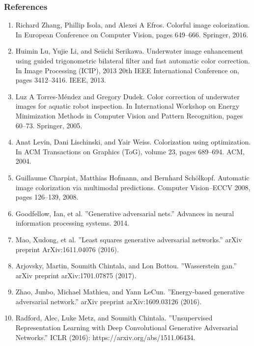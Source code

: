 \documentclass{beamer}
\begin{document}


\begin{frame}
\frametitle{\textbf{References}}
\tiny
\begin{enumerate}
\item Richard Zhang, Phillip Isola, and Alexei A Efros. Colorful image colorization. In European Conference on Computer Vision,
pages 649–666. Springer, 2016.
\item Huimin Lu, Yujie Li, and Seiichi Serikawa. Underwater image enhancement using guided trigonometric bilateral filter and fast
automatic color correction. In Image Processing (ICIP), 2013 20th IEEE International Conference on, pages 3412–3416. IEEE, 2013.
\item Luz A Torres-Méndez and Gregory Dudek. Color correction of underwater images for aquatic robot inspection. In International
Workshop on Energy Minimization Methods in Computer Vision and Pattern Recognition, pages 60–73. Springer, 2005.
\item Anat Levin, Dani Lischinski, and Yair Weiss. Colorization using optimization. In ACM Transactions on Graphics (ToG), volume 23, pages 689–694. ACM, 2004.
\item Guillaume Charpiat, Matthias Hofmann, and Bernhard Schölkopf. Automatic image colorization via multimodal predictions. Computer Vision–ECCV 2008, pages 126–139, 2008.
\item Goodfellow, Ian, et al. ”Generative adversarial nets.” Advances in neural information processing systems. 2014.
\item Mao, Xudong, et al. ”Least squares generative adversarial networks.” arXiv preprint ArXiv:1611.04076 (2016).
\item Arjovsky, Martin, Soumith Chintala, and Lon Bottou. ”Wasserstein gan.” arXiv preprint arXiv:1701.07875 (2017).
\item Zhao, Junbo, Michael Mathieu, and Yann LeCun. ”Energy-based generative adversarial network.” arXiv preprint
arXiv:1609.03126 (2016).
\item Radford, Alec, Luke Metz, and Soumith Chintala. ”Unsupervised Representation Learning with Deep Convolutional Generative Adversarial Networks.” ICLR (2016): https://arxiv.org/abs/1511.06434.










\end{enumerate}
\end{frame}
\end{document}
